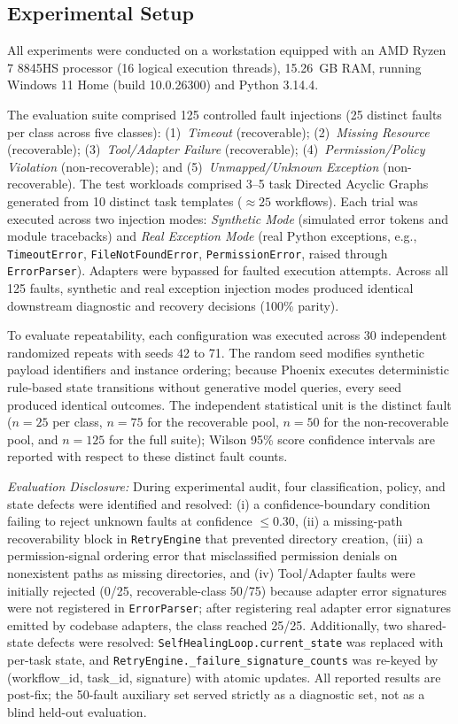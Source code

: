 \documentclass[conference]{IEEEtran}
\newcommand{\chg}[1]{{\color{blue}#1}}
\begin{document}
\subsection{Experimental Setup}
All experiments were conducted on a workstation equipped with an AMD Ryzen 7 8845HS processor (16 logical execution threads), 15.26~GB RAM, running Windows 11 Home (build 10.0.26300) and Python 3.14.4. 

The evaluation suite comprised 125 controlled fault injections (25 distinct faults per class across five classes): (1)~\textit{Timeout} (recoverable); (2)~\textit{Missing Resource} (recoverable); (3)~\textit{Tool/Adapter Failure} (recoverable); (4)~\textit{Permission/Policy Violation} (non-recoverable); and (5)~\textit{Unmapped/Unknown Exception} (non-recoverable). The test workloads comprised 3--5 task Directed Acyclic Graphs generated from 10 distinct task templates ($\approx 25$ workflows). Each trial was executed across two injection modes: \textit{Synthetic Mode} (simulated error tokens and module tracebacks) and \textit{Real Exception Mode} (real Python exceptions, e.g., \texttt{TimeoutError}, \texttt{FileNotFoundError}, \texttt{PermissionError}, raised through \texttt{ErrorParser}). Adapters were bypassed for faulted execution attempts. Across all 125 faults, synthetic and real exception injection modes produced identical downstream diagnostic and recovery decisions (100\% parity).

To evaluate repeatability, each configuration was executed across 30 independent randomized repeats with seeds 42 to 71. The random seed modifies synthetic payload identifiers and instance ordering; because Phoenix executes deterministic rule-based state transitions without generative model queries, every seed produced identical outcomes. The independent statistical unit is the distinct fault ($n=25$ per class, $n=75$ for the recoverable pool, $n=50$ for the non-recoverable pool, and $n=125$ for the full suite); Wilson 95\% score confidence intervals are reported with respect to these distinct fault counts.

\textit{Evaluation Disclosure:} During experimental audit, four classification, policy, and state defects were identified and resolved: (i) a confidence-boundary condition failing to reject unknown faults at confidence $\le 0.30$, (ii) a missing-path recoverability block in \texttt{RetryEngine} that prevented directory creation, (iii) a permission-signal ordering error that misclassified permission denials on nonexistent paths as missing directories, \chg{and (iv) Tool/Adapter faults were initially rejected (0/25, recoverable-class 50/75) because adapter error signatures were not registered in \texttt{ErrorParser}; after registering real adapter error signatures emitted by codebase adapters, the class reached 25/25. Additionally, two shared-state defects were resolved: \texttt{SelfHealingLoop.current\_state} was replaced with per-task state, and \texttt{RetryEngine.\_failure\_signature\_counts} was re-keyed by (workflow\_id, task\_id, signature) with atomic updates.} All reported results are post-fix; the 50-fault auxiliary set served strictly as a diagnostic set, not as a blind held-out evaluation.
\end{document}

